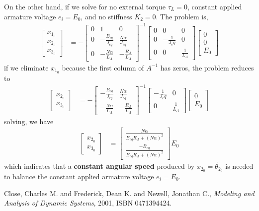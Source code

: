 \documentclass[]{article}
\begin{document}
On the other hand, if we solve for no external torque $\tau_L=0$, constant applied armature voltage $e_i=E_0$, and no stiffness $K_2 = 0$. The problem is,
\begin{align*}
	\begin{bmatrix}
		x_{1_0} \\
		x_{2_0} \\
		x_{3_0}
	\end{bmatrix}
	& = - 
	\begin{bmatrix}
		0 & 1                      & 0                       \\
		0 & -\frac{B_{eq}}{J_{eq}} & \frac{N \alpha}{J_{eq}} \\
		0 & -\frac{N \alpha}{L_A}  & -\frac{R_A}{L_A}
	\end{bmatrix}^{-1}
	\begin{bmatrix}
		0 & 0               & 0             \\
		0 & -\frac{1}{J_eq} & 0             \\
		0 & 0               & \frac{1}{L_A}
	\end{bmatrix}
	\begin{bmatrix}
		0   \\
		0   \\
		E_0
	\end{bmatrix}
\end{align*}
if we eliminate $x_{1_0}$ because the first column of $A^{-1}$ has zeros, the problem reduces to
\begin{align}
	\begin{bmatrix}
		x_{2_0} \\
		x_{3_0}
	\end{bmatrix}
	& = - 
	\begin{bmatrix}
		-\frac{B_{eq}}{J_{eq}} & \frac{N \alpha}{J_{eq}} \\
		-\frac{N \alpha}{L_A}  & -\frac{R_A}{L_A}
	\end{bmatrix}^{-1}
	\begin{bmatrix}
		-\frac{1}{J_eq} & 0             \\
		0               & \frac{1}{L_A}
	\end{bmatrix}
	\begin{bmatrix}
		0   \\
		E_0
	\end{bmatrix}
\end{align}
solving, we have
\begin{align}
	\begin{bmatrix}
		x_{2_0} \\
		x_{3_0}
	\end{bmatrix}
	& = 
	\begin{bmatrix}
		\frac{N \alpha}{B_{eq} R_A+(N \alpha)^2}\\
		\frac{-B_{eq}}{B_{eq} R_A+(N \alpha)^2}
	\end{bmatrix}
	E_0
\end{align}
which indicates that a \textbf{constant angular speed} produced by $x_{2_0}=\dot{\theta_{2_0}}$ is needed to balance the constant applied armature voltage $e_i=E_0$.




\begin{thebibliography}{99}
	 Close, Charles M. and Frederick, Dean K. and Newell, Jonathan C., \textit{Modeling and Analysis of Dynamic Systems}, 2001, ISBN 0471394424.
\end{thebibliography}
\end{document}
